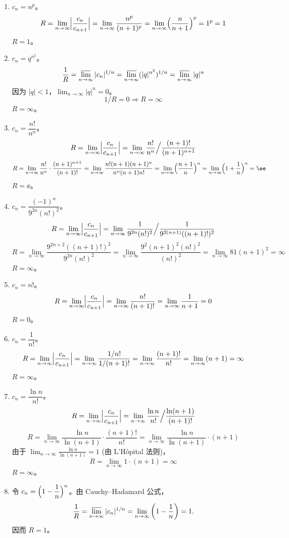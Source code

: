 \begin{question}
\begin{solution}
\begin{enumerate}
  \item\(c_n = n^p\)。
    \[
    R = \lim_{n\to\infty} \Bigl|\frac{c_n}{c_{n+1}}\Bigr| = \lim_{n\to\infty} \frac{n^p}{(n+1)^p} = \lim_{n\to\infty} \Bigl(\frac{n}{n+1}\Bigr)^p = 1^p = 1
    \]
    \(R=1\)。
  \item\(c_n = q^{n^2}\)。
    \[
    \frac1R = \varlimsup_{n\to\infty} |c_n|^{1/n} = \varlimsup_{n\to\infty} (|q|^{n^2})^{1/n} = \varlimsup_{n\to\infty} |q|^n
    \]
    因为 \(|q| < 1\)，\(\displaystyle\lim_{n\to\infty} |q|^n = 0\)。
    \[
    1/R = 0 \Rightarrow R = \infty
    \]
    \(R = \infty\)。
  \item\(c_n = \dfrac{n!}{n^n}\)。
    \[
    R = \lim_{n\to\infty} \Bigl|\frac{c_n}{c_{n+1}}\Bigr| = \lim_{n\to\infty} \frac{n!}{n^n} \Big/ \frac{(n+1)!}{(n+1)^{n+1}}
    \]
    \[
    R = \lim_{n\to\infty} \frac{n!}{n^n} \cdot \frac{(n+1)^{n+1}}{(n+1)!} = \lim_{n\to\infty} \frac{n!(n+1)(n+1)^n}{n^n (n+1)n!} = \lim_{n\to\infty} \Bigl(\frac{n+1}{n}\Bigr)^n = \lim_{n\to\infty} \Bigl(1+\frac1n\Bigr)^n = \ee
    \]
    \(R = \ee\)。
  \item\(c_n = \dfrac{(-1)^n}{9^{2n}(n!)^2}\)。
    \[
    R = \lim_{n\to\infty} \Bigl|\frac{c_n}{c_{n+1}}\Bigr| = \lim_{n\to\infty} \frac{1}{9^{2n}(n!)^2} \Big/ \frac{1}{9^{2(n+1)}((n+1)!)^2}
    \]
    \[
    R = \lim_{n\to\infty} \frac{9^{2n+2}((n+1)!)^2}{9^{2n}(n!)^2} = \lim_{n\to\infty} \frac{9^2 (n+1)^2 (n!)^2}{(n!)^2} = \lim_{n\to\infty} 81(n+1)^2 = \infty
    \]
    \(R = \infty\)。
  \item\(c_n = n!\)。
    \[
    R = \lim_{n\to\infty} \Bigl|\frac{c_n}{c_{n+1}}\Bigr| = \lim_{n\to\infty} \frac{n!}{(n+1)!} = \lim_{n\to\infty} \frac1{n+1} = 0
    \]
    \(R = 0\)。
  \item\(c_n = \dfrac1{n!}\)。
    \[
    R = \lim_{n\to\infty} \Bigl|\frac{c_n}{c_{n+1}}\Bigr| = \lim_{n\to\infty} \frac{1/n!}{1/(n+1)!} = \lim_{n\to\infty} \frac{(n+1)!}{n!} = \lim_{n\to\infty} (n+1) = \infty
    \]
    \(R = \infty\)。
  \item\(c_n = \dfrac{\ln n}{n!}\)。
    \[
    R = \lim_{n\to\infty} \Bigl|\frac{c_n}{c_{n+1}}\Bigr| = \lim_{n\to\infty} \frac{\ln n}{n!} \Big/ \frac{\ln(n+1)}{(n+1)!}
    \]
    \[
    R = \lim_{n\to\infty} \frac{\ln n}{\ln(n+1)} \cdot \frac{(n+1)!}{n!} = \lim_{n\to\infty} \frac{\ln n}{\ln(n+1)} \cdot (n+1)
    \]
    由于 \(\displaystyle\lim_{n\to\infty} \frac{\ln n}{\ln(n+1)} = 1\) (由 L'H\^{o}pital 法则)，
    \[
    R = \lim_{n\to\infty} 1\cdot (n+1) = \infty
    \]
    \(R = \infty\)。
  \item 令 \(c_n=\Bigl(1-\dfrac1n\Bigr)^n\)。由 Cauchy--Hadamard 公式，
    \[
    \frac1R
    =\varlimsup_{n\to\infty}|c_n|^{1/n}
    =\lim_{n\to\infty}\left(1-\frac1n\right)
    =1.
    \]
    因而 \(R=1\)。
\end{enumerate}
\end{solution}
\end{question}

